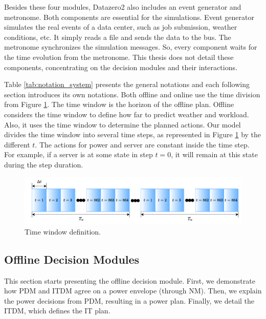 Besides these four modules, Datazero2 also includes an event generator and metronome. Both components are essential for the simulations. Event generator simulates the real events of a data center, such as job submission, weather conditions, etc. It simply reads a file and sends the data to the bus. The metronome synchronizes the simulation messages. So, every component waits for the time evolution from the metronome. This thesis does not detail these components, concentrating on the decision modules and their interactions.



Table \ref{tab:notation_system} presents the general notations and each following section introduces its own notations. Both offline and online use the time division from Figure \ref{fig:time_window}. The time window is the horizon of the offline plan. Offline considers the time window to define how far to predict weather and workload. Also, it uses the time window to determine the planned actions. Our model divides the time window into several time steps, as represented in Figure \ref{fig:time_window} by the different $t$. The actions for power and server are constant inside the time step. For example, if a server is at some state in step $t=0$, it will remain at this state during the step duration.

\begin{figure}[!htb]
    \centering
    \includegraphics[scale=0.75]{Images/Model/Time window.pdf}
    \caption{Time window definition.}
    \label{fig:time_window}
\end{figure}

\subsection{Offline Decision Modules}
\label{sec:offline_modules}

This section starts presenting the offline decision module. First, we demonstrate how PDM and ITDM agree on a power envelope (through NM). Then, we explain the power decisions from PDM, resulting in a power plan. Finally, we detail the ITDM, which defines the IT plan.

